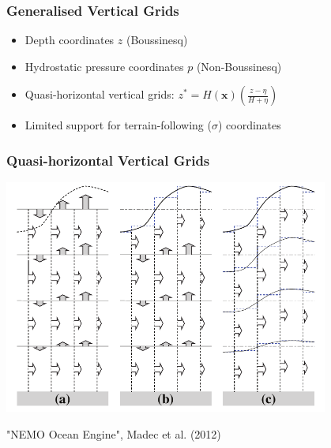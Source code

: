 \documentclass[red]{beamer}
\begin{document}
\begin{frame}
    \frametitle{Generalised Vertical Grids}
    
    \begin{itemize}
        \item Depth coordinates $z$ (Boussinesq)
         
        \item Hydrostatic pressure coordinates $p$ (Non-Boussinesq)
        
        \item Quasi-horizontal vertical grids:
            $z^* = H(\mathbf{x}) \left(\frac{z - \eta}{H + \eta}\right)$
        
        \item Limited support for terrain-following ($\sigma$) coordinates
    \end{itemize}
\end{frame}

\begin{frame}
    \frametitle{Quasi-horizontal Vertical Grids}
    
    \begin{center}
        \includegraphics[width=0.8\textwidth]{zstar.pdf}
    \end{center}
    
    {\tiny "NEMO Ocean Engine", Madec et al. (2012)}
\end{frame}
\end{document}
